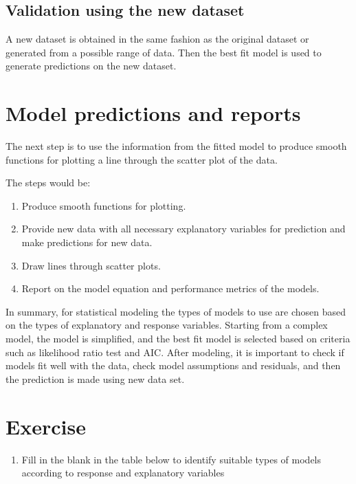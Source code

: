\documentclass[
]{book}
\providecommand{\tightlist}{%
  \setlength{\itemsep}{0pt}\setlength{\parskip}{0pt}}
\begin{document}
\subsection{Validation using the new dataset}\label{validation-using-the-new-dataset}

A new dataset is obtained in the same fashion as the original dataset or generated from a possible range of data. Then the best fit model is used to generate predictions on the new dataset.

\section{Model predictions and reports}\label{model-predictions-and-reports}

The next step is to use the information from the fitted model to produce smooth functions for plotting a line through the scatter plot of the data.

The steps would be:

\begin{enumerate}
\def\labelenumi{\arabic{enumi}.}
\tightlist
\item
  Produce smooth functions for plotting.
\item
  Provide new data with all necessary explanatory variables for prediction and make predictions for new data.
\item
  Draw lines through scatter plots.
\item
  Report on the model equation and performance metrics of the models.
\end{enumerate}

In summary, for statistical modeling the types of models to use are chosen based on the types of explanatory and response variables. Starting from a complex model, the model is simplified, and the best fit model is selected based on criteria such as likelihood ratio test and AIC. After modeling, it is important to check if models fit well with the data, check model assumptions and residuals, and then the prediction is made using new data set.

\section{Exercise}\label{exercise-2}

\begin{enumerate}
\def\labelenumi{\arabic{enumi}.}
\tightlist
\item
  Fill in the blank in the table below to identify suitable types of models according to response and explanatory variables
\end{enumerate}
\end{document}
